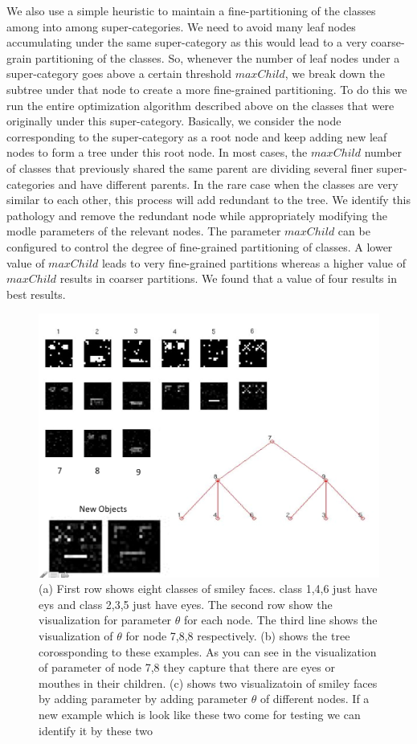 \documentclass[10pt,twocolumn,letterpaper]{article}
\begin{document}
We also use a simple heuristic to maintain a fine-partitioning of the classes among into among super-categories. 
We need to avoid many leaf nodes accumulating under the 
same super-category as this would lead to a very coarse-grain partitioning of the classes.  So, whenever the number of leaf nodes under a 
super-category goes above a certain threshold $maxChild$, we break down the subtree under that node to create
 a more fine-grained partitioning.  To do this we run the entire optimization algorithm described above on the classes that were originally under this
 super-category. Basically, we consider the node corresponding to the super-category as a root node and keep adding new leaf nodes 
 to form a tree under this root node. In most cases, the $maxChild$ number of classes that previously shared the same parent are dividing
 several finer super-categories and have different parents.  In the rare case when the classes are very similar to each other, this process will add
 redundant to the tree. We identify this pathology and remove the redundant node while appropriately modifying the modle parameters of the 
 relevant nodes. The parameter $maxChild$ can be configured to control the degree of fine-grained partitioning of classes. A lower value
 of $maxChild$ leads to very fine-grained partitions whereas a higher value of $maxChild$ results in coarser partitions. We found that 
 a value of four results in best results. 
 
 \begin{figure}[t]
 	\begin{center}
 		\includegraphics[width=0.8\linewidth]{smiley}
 	\end{center}
 	\caption{(a) First row shows eight classes of smiley faces. class 1,4,6 just have eys and class 2,3,5 just have eyes. The second row show the visualization for parameter $\theta$ for each node. The third line shows the visualization of $\theta$ for node 7,8,8 respectively. (b) shows the tree corossponding to these examples. As you can see in the visualization of parameter of node 7,8 they capture that there are eyes or mouthes in their children. (c) shows two visualizatoin of smiley faces by adding parameter by adding parameter $\theta$ of different nodes. If a new example which is look like these two come for testing we can identify it by these two}
 	\label{fig:long}
 	\label{fig:onecol}
 \end{figure}
\end{document}
